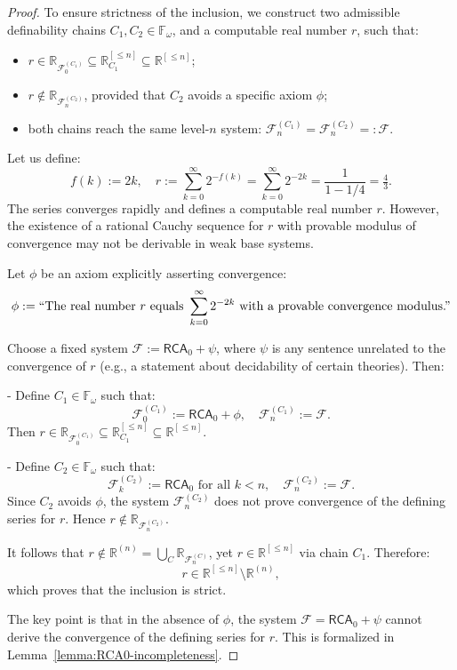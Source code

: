 \documentclass[10pt,a4paper]{amsart}
\begin{document}
\begin{proof}
To ensure strictness of the inclusion, we construct two admissible definability chains \( C_1, C_2 \in \mathbb{F}_\omega \), and a computable real number \( r \), such that:
\begin{itemize}
    \item \( r \in \mathbb{R}_{\mathcal{F}_0^{(C_1)}} \subseteq \mathbb{R}_{C_1}^{[\leq n]} \subseteq \mathbb{R}^{[\leq n]} \);
    \item \( r \notin \mathbb{R}_{\mathcal{F}_n^{(C_2)}} \), provided that \( C_2 \) avoids a specific axiom \( \phi \);
    \item both chains reach the same level-\( n \) system: \( \mathcal{F}_n^{(C_1)} = \mathcal{F}_n^{(C_2)} =: \mathcal{F} \).
\end{itemize}

Let us define:
\[
    f(k) := 2k, \quad r := \sum_{k=0}^{\infty} 2^{-f(k)} = \sum_{k=0}^{\infty} 2^{-2k} = \frac{1}{1 - 1/4} = \tfrac{4}{3}.
\]
The series converges rapidly and defines a computable real number \( r \). However, the existence of a rational Cauchy sequence for \( r \) with provable modulus of convergence may not be derivable in weak base systems.

Let \( \phi \) be an axiom explicitly asserting convergence:
\[
    \phi := \text{``The real number \( r \) equals } \sum_{k=0}^\infty 2^{-2k} \text{ with a provable convergence modulus.''}
\]

Choose a fixed system \( \mathcal{F} := \mathsf{RCA}_0 + \psi \), where \( \psi \) is any sentence unrelated to the convergence of \( r \) (e.g., a statement about decidability of certain theories). Then:

- Define \( C_1 \in \mathbb{F}_\omega \) such that:
  \[
      \mathcal{F}_0^{(C_1)} := \mathsf{RCA}_0 + \phi, \quad \mathcal{F}_n^{(C_1)} := \mathcal{F}.
  \]
  Then \( r \in \mathbb{R}_{\mathcal{F}_0^{(C_1)}} \subseteq \mathbb{R}_{C_1}^{[\leq n]} \subseteq \mathbb{R}^{[\leq n]} \).

- Define \( C_2 \in \mathbb{F}_\omega \) such that:
  \[
      \mathcal{F}_k^{(C_2)} := \mathsf{RCA}_0 \text{ for all } k < n, \quad \mathcal{F}_n^{(C_2)} := \mathcal{F}.
  \]
  Since \( C_2 \) avoids \( \phi \), the system \( \mathcal{F}_n^{(C_2)} \) does not prove convergence of the defining series for \( r \). Hence \( r \notin \mathbb{R}_{\mathcal{F}_n^{(C_2)}} \).

It follows that \( r \notin \mathbb{R}^{(n)} = \bigcup_{C} \mathbb{R}_{\mathcal{F}_n^{(C)}} \), yet \( r \in \mathbb{R}^{[\leq n]} \) via chain \( C_1 \). Therefore:
\[
    r \in \mathbb{R}^{[\leq n]} \setminus \mathbb{R}^{(n)},
\]
which proves that the inclusion is strict.

The key point is that in the absence of \( \phi \), the system \( \mathcal{F} = \mathsf{RCA}_0 + \psi \) cannot derive the convergence of the defining series for \( r \). This is formalized in Lemma~\ref{lemma:RCA0-incompleteness}.
\end{proof}
\end{document}
